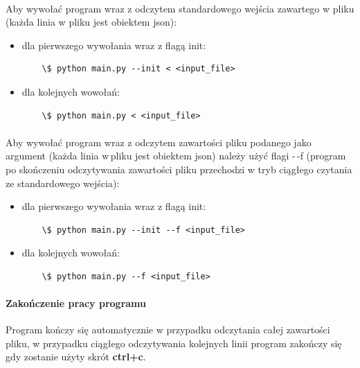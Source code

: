\documentclass{article}
\begin{document}
\paragraph{}  
Aby wywołać program wraz z odczytem standardowego wejścia zawartego w pliku (każda linia w\,\,pliku jest obiektem json):
\begin{itemize}
\item dla pierwszego wywołania wraz z flagą init:
\begin{verbatim}
    \$ python main.py --init < <input_file>
\end{verbatim}
\item dla kolejnych wowołań:
\begin{verbatim}
    \$ python main.py < <input_file>
\end{verbatim}
\end{itemize}

\paragraph{}  
Aby wywołać program wraz z odczytem zawartości pliku podanego jako argument (każda linia w\,pliku jest obiektem json) należy użyć flagi -\,-f \newline
(program po skończeniu odczytywania zawartości pliku przechodzi w tryb ciągłego czytania ze standardowego wejścia):
\begin{itemize}
\item dla pierwszego wywołania wraz z flagą init:
\begin{verbatim}
    \$ python main.py --init --f <input_file>
\end{verbatim}
\item dla kolejnych wowołań:
\begin{verbatim}
    \$ python main.py --f <input_file>
\end{verbatim}
\end{itemize}

\paragraph{Zakończenie pracy programu \newline}  
Program kończy się automatycznie w przypadku odczytania całej zawartości pliku,
w przypadku ciągłego odczytywania kolejnych linii program zakończy się gdy zostanie użyty skrót \textbf{ctrl+c}.
\end{document}
